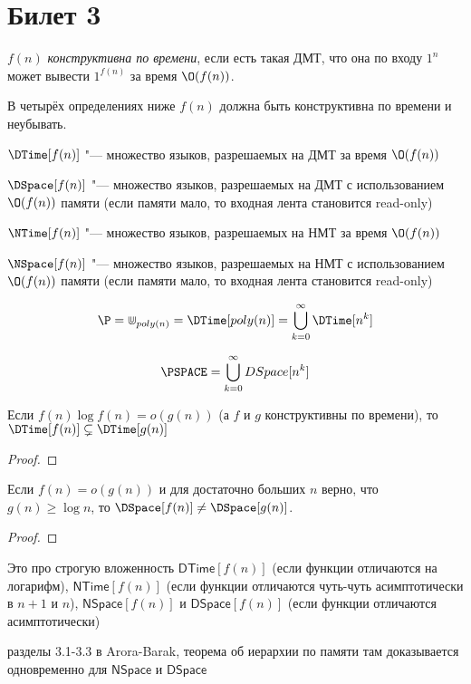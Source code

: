 \setcounter{section}{2}
\section{Билет 3}
	\begin{Def}
		$f(n)$ \textit{конструктивна по времени}, если есть такая ДМТ, что она по входу $1^n$
		может вывести $1^{f(n)}$ за время $\O(f(n))$.
	\end{Def}
	\begin{Rem}
		В четырёх определениях ниже $f(n)$ должна быть конструктивна по времени и неубывать.
	\end{Rem}
	\begin{Def}
		$\DTime[f(n)]$ "--- множество языков, разрешаемых на ДМТ за время $\O(f(n))$
	\end{Def}
	\begin{Def}
		$\DSpace[f(n)]$ "--- множество языков, разрешаемых на ДМТ с использованием $\O(f(n))$ памяти (если памяти мало, то входная лента становится read-only)
	\end{Def}
	\begin{Def}
		$\NTime[f(n)]$ "--- множество языков, разрешаемых на НМТ за время $\O(f(n))$
	\end{Def}
	\begin{Def}
		$\NSpace[f(n)]$ "--- множество языков, разрешаемых на НМТ с использованием $\O(f(n))$ памяти (если памяти мало, то входная лента становится read-only)
	\end{Def}

	\begin{exmp}
		\[ \P = \Cup_{poly(n)} = \DTime[poly(n)] = \bigcup\limits_{k=0}^{\infty} \DTime[n^k] \]
	\end{exmp}
	\begin{Def}
		\[ \PSPACE = \bigcup\limits_{k=0}^\infty DSpace[n^k] \]
	\end{Def}

	\begin{theorem}
		Если $f(n) \log f(n) = o(g(n))$ (а $f$ и $g$ конструктивны по времени), то $\DTime[f(n)] \subsetneq \DTime[g(n)]$
	\end{theorem}
	\begin{proof}
		\TODO
	\end{proof}

	\begin{theorem}
		Если $f(n)=o(g(n))$ и для достаточно больших $n$ верно, что $g(n) \ge \log n$, то $\DSpace[f(n)] \neq \DSpace[g(n)]$.
	\end{theorem}
	\begin{proof}
		\TODO
	\end{proof}

	Это про строгую вложенность $\mathsf{DTime}[f(n)]$ (если функции отличаются на логарифм), $\mathsf{NTime}[f(n)]$ (если функции отличаются чуть-чуть асимптотически в $n+1$ и $n$),
	$\mathsf{NSpace}[f(n)]$ и $\mathsf{DSpace}[f(n)]$ (если функции отличаются асимптотически)

	\TODO разделы 3.1-3.3 в Arora-Barak, теорема об иерархии по памяти там доказывается одновременно для $\mathsf{NSpace}$ и $\mathsf{DSpace}$
